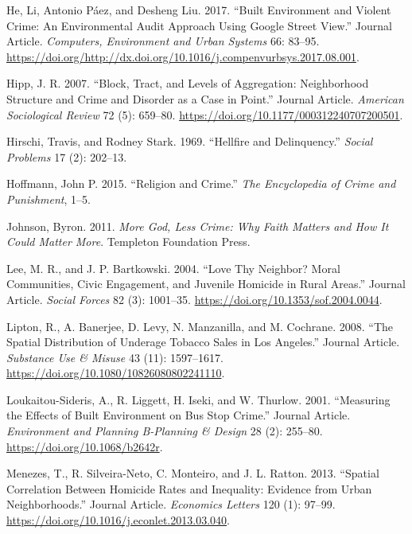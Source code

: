 \documentclass[smallextended]{svjour3}       %
\begin{document}
\leavevmode\hypertarget{ref-He2017built}{}%
He, Li, Antonio Páez, and Desheng Liu. 2017. ``Built Environment and
Violent Crime: An Environmental Audit Approach Using Google Street
View.'' Journal Article. \emph{Computers, Environment and Urban Systems}
66: 83--95.
\url{https://doi.org/http://dx.doi.org/10.1016/j.compenvurbsys.2017.08.001}.

\leavevmode\hypertarget{ref-Hipp2007block}{}%
Hipp, J. R. 2007. ``Block, Tract, and Levels of Aggregation:
Neighborhood Structure and Crime and Disorder as a Case in Point.''
Journal Article. \emph{American Sociological Review} 72 (5): 659--80.
\url{https://doi.org/10.1177/000312240707200501}.

\leavevmode\hypertarget{ref-Hirschi1969hellfire}{}%
Hirschi, Travis, and Rodney Stark. 1969. ``Hellfire and Delinquency.''
\emph{Social Problems} 17 (2): 202--13.

\leavevmode\hypertarget{ref-Hoffmann2015religion}{}%
Hoffmann, John P. 2015. ``Religion and Crime.'' \emph{The Encyclopedia
of Crime and Punishment}, 1--5.

\leavevmode\hypertarget{ref-Johnson2011more}{}%
Johnson, Byron. 2011. \emph{More God, Less Crime: Why Faith Matters and
How It Could Matter More}. Templeton Foundation Press.

\leavevmode\hypertarget{ref-Lee2004love}{}%
Lee, M. R., and J. P. Bartkowski. 2004. ``Love Thy Neighbor? Moral
Communities, Civic Engagement, and Juvenile Homicide in Rural Areas.''
Journal Article. \emph{Social Forces} 82 (3): 1001--35.
\url{https://doi.org/10.1353/sof.2004.0044}.

\leavevmode\hypertarget{ref-Lipton2008spatial}{}%
Lipton, R., A. Banerjee, D. Levy, N. Manzanilla, and M. Cochrane. 2008.
``The Spatial Distribution of Underage Tobacco Sales in Los Angeles.''
Journal Article. \emph{Substance Use \& Misuse} 43 (11): 1597--1617.
\url{https://doi.org/10.1080/10826080802241110}.

\leavevmode\hypertarget{ref-Loukaitou2001measuring}{}%
Loukaitou-Sideris, A., R. Liggett, H. Iseki, and W. Thurlow. 2001.
``Measuring the Effects of Built Environment on Bus Stop Crime.''
Journal Article. \emph{Environment and Planning B-Planning \& Design} 28
(2): 255--80. \url{https://doi.org/10.1068/b2642r}.

\leavevmode\hypertarget{ref-Menezes2013spatial}{}%
Menezes, T., R. Silveira-Neto, C. Monteiro, and J. L. Ratton. 2013.
``Spatial Correlation Between Homicide Rates and Inequality: Evidence
from Urban Neighborhoods.'' Journal Article. \emph{Economics Letters}
120 (1): 97--99. \url{https://doi.org/10.1016/j.econlet.2013.03.040}.
\end{document}
